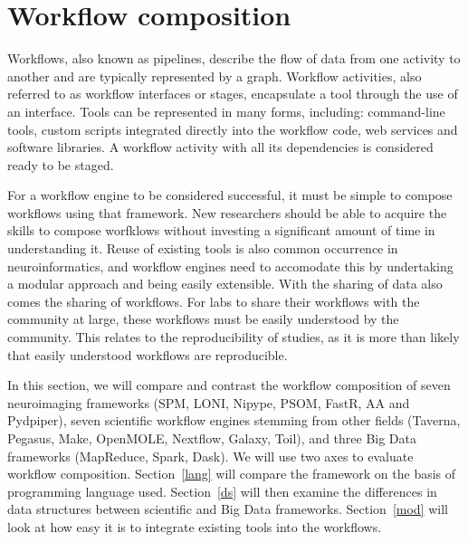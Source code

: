     \section{Workflow composition}\label{workcomp}

        Workflows, also known as pipelines, describe the flow of data from one
        activity to another and are typically represented by a graph. Workflow
        activities, also referred to as workflow interfaces or stages,
        encapsulate a tool through the use of an interface. Tools can be
        represented in many forms, including: command-line tools, custom scripts
        integrated directly into the workflow code, web services and software
        libraries. A workflow activity with all its dependencies is considered
        ready to be staged.

        For a workflow engine to be considered successful, it must be simple to
        compose workflows using that framework. New researchers should be able
        to acquire the skills to compose worfklows without investing a
        significant amount of time in understanding it. Reuse of existing tools
        is also common occurrence in neuroinformatics, and workflow engines need
        to accomodate this by undertaking a modular approach and being easily
        extensible. With the sharing of data also comes the sharing of
        workflows. For labs to share their workflows with the community at
        large, these workflows must be easily understood by the community. This
        relates to the reproducibility of studies, as it is more than likely
        that easily understood workflows are reproducible. 

        In this section, we will compare and contrast the workflow composition
        of seven neuroimaging frameworks (SPM, LONI, Nipype, PSOM, FastR, AA and
        Pydpiper), seven scientific workflow engines stemming from other fields
        (Taverna, Pegasus, Make, OpenMOLE, Nextflow, Galaxy, Toil), and three
        Big Data frameworks (MapReduce, Spark, Dask). We will use two axes to
        evaluate workflow composition. Section~\ref{lang} will compare the
        framework on the basis of programming language used. Section~\ref{ds}
        will then examine the differences in data structures between scientific
        and Big Data frameworks. Section~\ref{mod} will look at how easy it is
        to integrate existing tools into the workflows.

